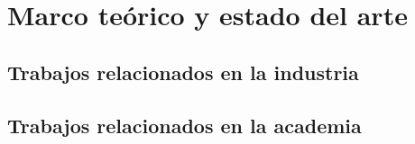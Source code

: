 \chapter{Marco teórico y estado del arte}
\label{chapter:state-of-art}

\Blindtext[1]

\section{Trabajos relacionados en la industria}
\label{section:relaccionados-industria}

\Blindtext[1]

\section{Trabajos relacionados en la academia}
\label{section:relacionados-academia}

\Blindtext[1]
